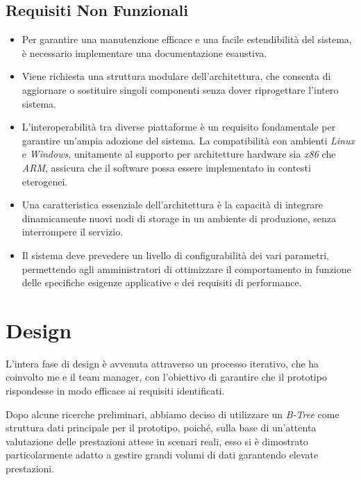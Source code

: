 \documentclass[12pt,a4paper,openright,twoside]{book}
\begin{document}
        \subsection{Requisiti Non Funzionali}

            \begin{itemize}
                \item Per garantire una manutenzione efficace e una facile estendibilità del sistema, è necessario implementare una documentazione esaustiva.
                \item Viene richiesta una struttura modulare dell’architettura, che consenta di aggiornare o sostituire singoli componenti senza dover riprogettare l’intero sistema.
                \item L’interoperabilità tra diverse piattaforme è un requisito fondamentale per garantire un’ampia adozione del sistema. La compatibilità con ambienti \textit{Linux} e \textit{Windows}, unitamente al supporto per architetture hardware sia \textit{x86} che \textit{ARM}, assicura che il software possa essere implementato in contesti eterogenei.
                \item Una caratteristica essenziale dell’architettura è la capacità di integrare dinamicamente nuovi nodi di storage in un ambiente di produzione, senza interrompere il servizio.
                \item Il sistema deve prevedere un livello di configurabilità dei vari parametri, permettendo agli amministratori di ottimizzare il comportamento in funzione delle specifiche esigenze applicative e dei requisiti di performance.
            \end{itemize}

    \section{Design}

        L'intera fase di design è avvenuta attraverso un processo iterativo, che ha coinvolto me e il team manager, con l'obiettivo di garantire che il prototipo rispondesse in modo efficace ai requisiti identificati.

        Dopo alcune ricerche preliminari, abbiamo deciso di utilizzare un \textit{B-Tree} come struttura dati principale per il prototipo, poiché, sulla base di un'attenta valutazione delle prestazioni attese in scenari reali, esso si è dimostrato particolarmente adatto a gestire grandi volumi di dati garantendo elevate prestazioni.
\end{document}
